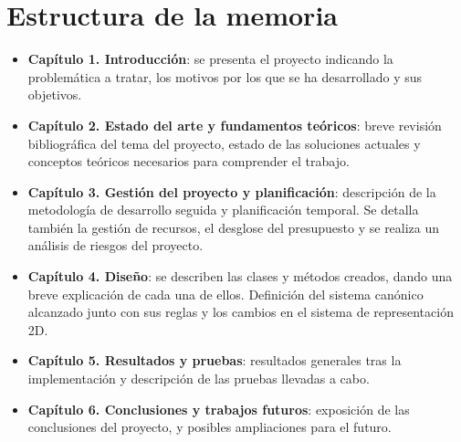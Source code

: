 \section{Estructura de la memoria}
\begin{itemize}
    \item \textbf{Capítulo 1. Introducción}: se presenta el proyecto indicando la problemática a tratar, los motivos por los que se ha desarrollado y sus objetivos. 
    \item \textbf{Capítulo 2. Estado del arte y fundamentos teóricos}: breve revisión bibliográfica del tema del proyecto, estado de las soluciones actuales y conceptos teóricos necesarios para comprender el trabajo.
    \item \textbf{Capítulo 3. Gestión del proyecto y planificación}: descripción de la metodología de desarrollo seguida y planificación temporal. Se detalla también la gestión de recursos, el desglose del presupuesto y se realiza un análisis de riesgos del proyecto.
    \item \textbf{Capítulo 4. Diseño}: se describen las clases y métodos creados, dando una breve explicación de cada una de ellos. Definición del sistema canónico alcanzado junto con sus reglas y los cambios en el sistema de representación 2D. 
    \item \textbf{Capítulo 5. Resultados y pruebas}: resultados generales tras la implementación y descripción de las pruebas llevadas a cabo.
    \item \textbf{Capítulo 6. Conclusiones y trabajos futuros}: exposición de las conclusiones del proyecto, y posibles ampliaciones para el futuro.
\end{itemize}
